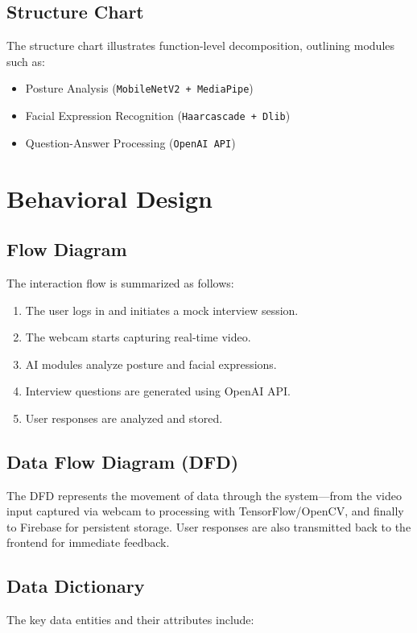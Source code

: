 \subsection{Structure Chart}
The structure chart illustrates function-level decomposition, outlining modules such as:
\begin{itemize}
  \item Posture Analysis (\texttt{MobileNetV2 + MediaPipe})
  \item Facial Expression Recognition (\texttt{Haarcascade + Dlib})
  \item Question-Answer Processing (\texttt{OpenAI API})
\end{itemize}

\section{Behavioral Design}

\subsection{Flow Diagram}
The interaction flow is summarized as follows:
\begin{enumerate}
  \item The user logs in and initiates a mock interview session.
  \item The webcam starts capturing real-time video.
  \item AI modules analyze posture and facial expressions.
  \item Interview questions are generated using OpenAI API.
  \item User responses are analyzed and stored.
\end{enumerate}

\subsection{Data Flow Diagram (DFD)}
The DFD represents the movement of data through the system—from the video input captured via webcam to processing with TensorFlow/OpenCV, and finally to Firebase for persistent storage. User responses are also transmitted back to the frontend for immediate feedback.

\subsection{Data Dictionary}
The key data entities and their attributes include:

